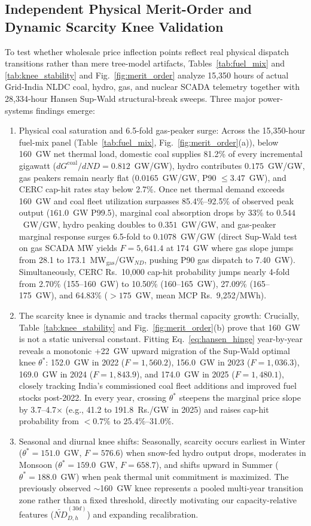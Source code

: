 \documentclass[journal,10pt,twocolumn]{IEEEtran}
\begin{document}
\subsection{Independent Physical Merit-Order and Dynamic Scarcity Knee Validation}
To test whether wholesale price inflection points reflect real physical dispatch transitions rather than mere tree-model artifacts, Tables~\ref{tab:fuel_mix} and \ref{tab:knee_stability} and Fig.~\ref{fig:merit_order} analyze 15,350 hours of actual Grid-India NLDC coal, hydro, gas, and nuclear SCADA telemetry together with 28,334-hour Hansen Sup-Wald structural-break sweeps. Three major power-systems findings emerge:
\begin{enumerate}
    \item Physical coal saturation and 6.5-fold gas-peaker surge: Across the 15,350-hour fuel-mix panel (Table~\ref{tab:fuel_mix}, Fig.~\ref{fig:merit_order}(a)), below 160~GW net thermal load, domestic coal supplies 81.2\% of every incremental gigawatt ($dG^{\text{coal}}/dND = 0.812$~GW/GW), hydro contributes $0.175$~GW/GW, gas peakers remain nearly flat ($0.0165$~GW/GW, P90 $\le 3.47$~GW), and CERC cap-hit rates stay below 2.7\%. Once net thermal demand exceeds 160~GW and coal fleet utilization surpasses 85.4\%--92.5\% of observed peak output ($161.0$~GW P99.5), marginal coal absorption drops by 33\% to $0.544$~GW/GW, hydro peaking doubles to $0.351$~GW/GW, and gas-peaker marginal response surges 6.5-fold to $0.1078$~GW/GW (direct Sup-Wald test on gas SCADA MW yields $F = 5,641.4$ at 174~GW where gas slope jumps from 28.1 to 173.1~MW$_{\text{gas}}$/GW$_{ND}$, pushing P90 gas dispatch to 7.40~GW). Simultaneously, CERC Rs.~10,000 cap-hit probability jumps nearly 4-fold from 2.70\% (155--160~GW) to 10.50\% (160--165~GW), 27.09\% (165--175~GW), and 64.83\% ($>175$~GW, mean MCP Rs.~9,252/MWh).
    \item The scarcity knee is dynamic and tracks thermal capacity growth: Crucially, Table~\ref{tab:knee_stability} and Fig.~\ref{fig:merit_order}(b) prove that 160~GW is not a static universal constant. Fitting Eq.~\ref{eq:hansen_hinge} year-by-year reveals a monotonic +22~GW upward migration of the Sup-Wald optimal knee $\theta^*$: 152.0~GW in 2022 ($F=1,560.2$), 156.0~GW in 2023 ($F=1,036.3$), 169.0~GW in 2024 ($F=1,843.9$), and 174.0~GW in 2025 ($F=1,480.1$), closely tracking India's commissioned coal fleet additions and improved fuel stocks post-2022. In every year, crossing $\theta^*$ steepens the marginal price slope by 3.7--4.7$\times$ (e.g., 41.2 to 191.8~Rs./GW in 2025) and raises cap-hit probability from $<0.7\%$ to 25.4\%--31.0\%.
    \item Seasonal and diurnal knee shifts: Seasonally, scarcity occurs earliest in Winter ($\theta^* = 151.0$~GW, $F=576.6$) when snow-fed hydro output drops, moderates in Monsoon ($\theta^* = 159.0$~GW, $F=658.7$), and shifts upward in Summer ($\theta^* = 188.0$~GW) when peak thermal unit commitment is maximized. The previously observed $\sim$160~GW knee represents a pooled multi-year transition zone rather than a fixed threshold, directly motivating our capacity-relative features ($\widetilde{ND}_{D,h}^{(30d)}$) and expanding recalibration.
\end{enumerate}
\end{document}
